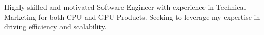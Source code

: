 

Highly skilled and motivated Software Engineer with experience in Technical Marketing for both CPU and GPU Products. Seeking to leverage my expertise in driving efficiency and scalability.